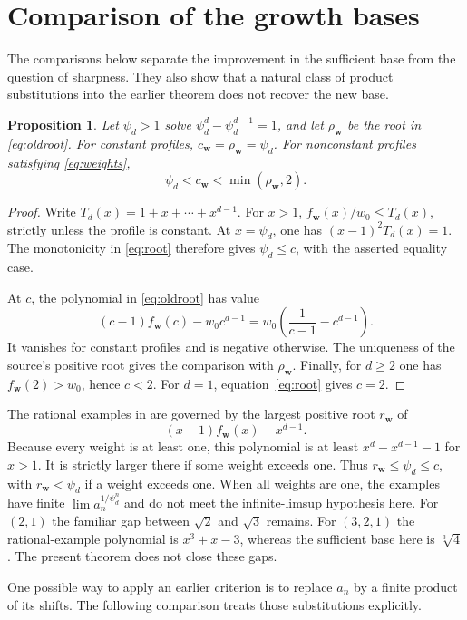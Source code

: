 \documentclass[11pt]{article}
\newtheorem{proposition}[theorem]{Proposition}
\numberwithin{equation}{section}
\newcommand{\bw}{\mathbf w}
\begin{document}
\section{Comparison of the growth bases}\label{sec:comparison}

The comparisons below separate the improvement in the sufficient base
from the question of sharpness. They also show that a natural class of
product substitutions into the earlier theorem does not recover the
new base.

\begin{proposition}\label{prop:roots}
Let $\psi_d>1$ solve $\psi_d^d-\psi_d^{d-1}=1$, and let
$\rho_{\bw}$ be the root in \eqref{eq:oldroot}.
For constant profiles, $c_{\bw}=\rho_{\bw}=\psi_d$.
For nonconstant profiles satisfying \eqref{eq:weights},
\[
  \psi_d<c_{\bw}<\min(\rho_{\bw},2).
\]
\end{proposition}

\begin{proof}
Write $T_d(x)=1+x+\cdots+x^{d-1}$. For $x>1$,
$f_{\bw}(x)/w_0\le T_d(x)$, strictly unless the profile is constant.
At $x=\psi_d$, one has $(x-1)^2T_d(x)=1$.
The monotonicity in \eqref{eq:root} therefore gives
$\psi_d\le c$, with the asserted equality case.

At $c$, the polynomial in \eqref{eq:oldroot} has value
\[
  (c-1)f_{\bw}(c)-w_0c^{d-1}
    =w_0\left(\frac1{c-1}-c^{d-1}\right).
\]
It vanishes for constant profiles and is negative otherwise.
The uniqueness of the source's positive root
\cite[Remark~4(1)]{BKKKZ} gives the comparison with $\rho_{\bw}$.
Finally, for $d\ge2$ one has $f_{\bw}(2)>w_0$, hence $c<2$.
For $d=1$, equation~\eqref{eq:root} gives $c=2$.
\end{proof}

The rational examples in \cite[Theorem~5]{BKKKZ} are governed by the
largest positive root $r_{\bw}$ of
\[
  (x-1)f_{\bw}(x)-x^{d-1}.
\]
Because every weight is at least one, this polynomial is at least
$x^d-x^{d-1}-1$ for $x>1$. It is strictly larger there if some weight
exceeds one. Thus $r_{\bw}\le\psi_d\le c$, with $r_{\bw}<\psi_d$
if a weight exceeds one. When all weights are one, the examples have
finite $\lim a_n^{1/\psi_d^n}$ and do not meet the infinite-limsup
hypothesis here. For $(2,1)$ the familiar gap between $\sqrt2$ and
$\sqrt3$ remains. For $(3,2,1)$ the rational-example polynomial is
$x^3+x-3$, whereas the sufficient base here is $\sqrt[3]{4}$.
The present theorem does not close these gaps.

One possible way to apply an earlier criterion is to replace $a_n$
by a finite product of its shifts. The following comparison treats
those substitutions explicitly.
\end{document}
